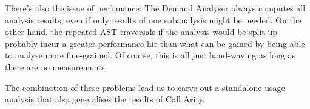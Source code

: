There's also the issue of perfomance:
The Demand Analyser always computes all analysis results, even if only results of one subanalysis might be needed.
On the other hand, the repeated AST traversals if the analysis would be split up probably incur a greater performance hit than what can be gained by being able to analyse more fine-grained.
Of course, this is all just hand-waving as long as there are no measurements.

The combination of these problems lead us to carve out a standalone usage analysis that also generalises the results of Call Arity.
